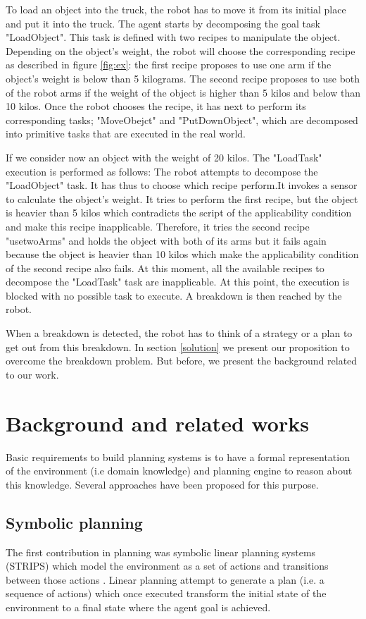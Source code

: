 \documentclass[conference]{IEEEtran}
\begin{document}
			
	\par To load an object into the truck, the robot has to move it from its initial place and put it into the truck. The agent starts by decomposing the goal task "LoadObject". This task is defined with two recipes to manipulate the object. Depending on the object's  weight, the robot will choose the corresponding recipe as described in figure \ref{fig:ex}: the first recipe proposes to use one arm if the object's weight is below than 5 kilograms. The second recipe proposes to use both of the robot arms if the weight of the object is higher than 5 kilos and below than 10 kilos. Once the robot chooses the recipe, it has next to perform  its corresponding tasks; "MoveObejct" and "PutDownObject", which are decomposed into primitive tasks that are executed in the real world. 
	\par If we consider now an object with the weight of 20 kilos. The "LoadTask" execution is  performed as follows: The robot attempts to decompose the "LoadObject" task. It has thus to choose which recipe perform.It invokes a sensor to calculate the object's weight. It tries to perform the first recipe, but the object is heavier than 5 kilos which contradicts the script of the applicability condition and make this recipe inapplicable. Therefore, it tries the second recipe "usetwoArms" and holds the object with both of its arms but it fails again because the object is heavier than 10 kilos which make the applicability condition of the second recipe also fails. At this moment, all the available recipes to decompose the "LoadTask" task are inapplicable. At this point, the execution is blocked with no possible task to execute. A breakdown is then reached by the robot. 
	\par When a breakdown is detected, the robot has to think of a strategy or a plan to get out from this breakdown.  In  section \ref{solution} we present our proposition to overcome the breakdown problem. But before, we present the background related to our work. 

	\section{Background and related works}
	Basic requirements to build planning systems is to have a formal representation of the environment (i.e domain knowledge) and planning engine to reason about this knowledge. Several approaches have been proposed for this purpose. 
	
	\subsection{Symbolic planning}
	\label{sec:symbolic}
	The first contribution in planning was symbolic linear planning systems (STRIPS)\cite{fikes1972strips} which model the environment as a set of actions and transitions between those actions . Linear planning attempt to generate a plan (i.e. a sequence of actions) which once executed transform the initial state of the environment to a final state where the agent goal is achieved. 
		
\end{document}
